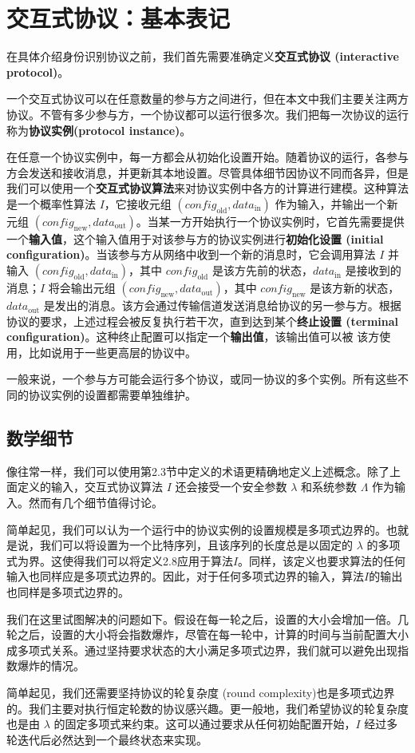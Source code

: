 \section{交互式协议：基本表记}

在具体介绍身份识别协议之前，我们首先需要准确定义\textbf{交互式协议 (interactive protocol)}。

一个交互式协议可以在任意数量的参与方之间进行，但在本文中我们主要关注两方协议。不管有多少参与方，一个协议都可以运行很多次。我们把每一次协议的运行称为\textbf{协议实例(protocol instance)}。

在任意一个协议实例中，每一方都会从初始化设置开始。随着协议的运行，各参与方会发送和接收消息，并更新其本地设置。尽管具体细节因协议不同而各异，但是我们可以使用一个\textbf{交互式协议算法}来对协议实例中各方的计算进行建模。这种算法是一个概率性算法 $I$，它接收元组 $({config}_\mathrm{old}, {data}_\mathrm{in})$ 作为输入，并输出一个新元组 $({config}_\mathrm{new}, {data}_\mathrm{out})$。当某一方开始执行一个协议实例时，它首先需要提供一个\textbf{输入值}，这个输入值用于对该参与方的协议实例进行\textbf{初始化设置 (initial configuration)}。当该参与方从网络中收到一个新的消息时，它会调用算法 $I$ 并输入 $({config}_\mathrm{old}, {data}_\mathrm{in})$，其中 ${config}_\mathrm{old}$ 是该方先前的状态，${data}_\mathrm{in}$ 是接收到的消息；$I$ 将会输出元组 $({config}_\mathrm{new}, {data}_\mathrm{out})$，其中 ${config}_\mathrm{new}$ 是该方新的状态，${data}_\mathrm{out}$ 是发出的消息。该方会通过传输信道发送消息给协议的另一参与方。根据协议的要求，上述过程会被反复执行若干次，直到达到某个\textbf{终止设置 (terminal configuration)}。这种终止配置可以指定一个\textbf{输出值}，该输出值可以被
该方使用，比如说用于一些更高层的协议中。

一般来说，一个参与方可能会运行多个协议，或同一协议的多个实例。所有这些不同的协议实例的设置都需要单独维护。

\subsection{数学细节}

像往常一样，我们可以使用第2.3节中定义的术语更精确地定义上述概念。除了上面定义的输入，交互式协议算法 $I$ 还会接受一个安全参数 $\lambda$ 和系统参数 $\Lambda$ 作为输入。然而有几个细节值得讨论。

简单起见，我们可以认为一个运行中的协议实例的设置规模是多项式边界的。也就是说，我们可以将设置为一个比特序列，且该序列的长度总是以固定的 $\lambda$ 的多项式为界。这使得我们可以将定义2.8应用于算法$I$。同样，该定义也要求算法的任何输入也同样应是多项式边界的。因此，对于任何多项式边界的输入，算法$I$的输出也同样是多项式边界的。

我们在这里试图解决的问题如下。假设在每一轮之后，设置的大小会增加一倍。几轮之后，设置的大小将会指数爆炸，尽管在每一轮中，计算的时间与当前配置大小成多项式关系。通过坚持要求状态的大小满足多项式边界，我们就可以避免出现指数爆炸的情况。

简单起见，我们还需要坚持协议的轮复杂度 (round complexity)也是多项式边界的。我们主要对执行恒定轮数的协议感兴趣。更一般地，我们希望协议的轮复杂度也是由 $\lambda$ 的固定多项式来约束。这可以通过要求从任何初始配置开始，$I$ 经过多轮迭代后必然达到一个最终状态来实现。